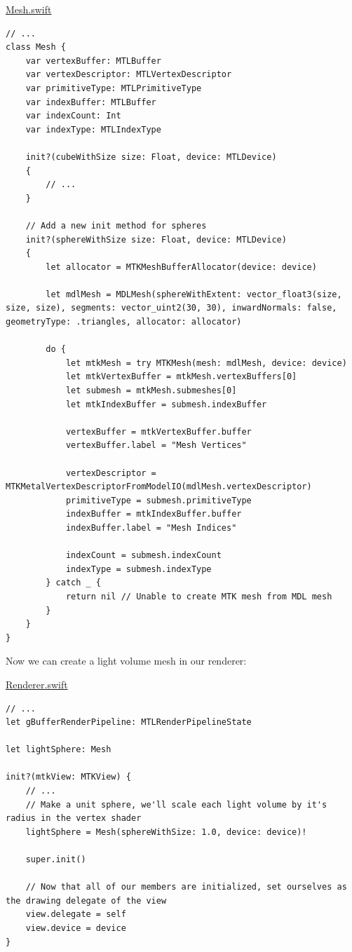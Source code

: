 \documentclass[11pt]{article}
\begin{document}
\uline{Mesh.swift}
\begin{verbatim}
// ...
class Mesh {
    var vertexBuffer: MTLBuffer
    var vertexDescriptor: MTLVertexDescriptor
    var primitiveType: MTLPrimitiveType
    var indexBuffer: MTLBuffer
    var indexCount: Int
    var indexType: MTLIndexType

    init?(cubeWithSize size: Float, device: MTLDevice)
    {
        // ...
    }

    // Add a new init method for spheres
    init?(sphereWithSize size: Float, device: MTLDevice)
    {
        let allocator = MTKMeshBufferAllocator(device: device)

        let mdlMesh = MDLMesh(sphereWithExtent: vector_float3(size, size, size), segments: vector_uint2(30, 30), inwardNormals: false, geometryType: .triangles, allocator: allocator)

        do {
            let mtkMesh = try MTKMesh(mesh: mdlMesh, device: device)
            let mtkVertexBuffer = mtkMesh.vertexBuffers[0]
            let submesh = mtkMesh.submeshes[0]
            let mtkIndexBuffer = submesh.indexBuffer

            vertexBuffer = mtkVertexBuffer.buffer
            vertexBuffer.label = "Mesh Vertices"

            vertexDescriptor = MTKMetalVertexDescriptorFromModelIO(mdlMesh.vertexDescriptor)
            primitiveType = submesh.primitiveType
            indexBuffer = mtkIndexBuffer.buffer
            indexBuffer.label = "Mesh Indices"

            indexCount = submesh.indexCount
            indexType = submesh.indexType
        } catch _ {
            return nil // Unable to create MTK mesh from MDL mesh
        }
    }
}
\end{verbatim}

Now we can create a light volume mesh in our renderer:

\uline{Renderer.swift}
\begin{verbatim}
// ...
let gBufferRenderPipeline: MTLRenderPipelineState

let lightSphere: Mesh

init?(mtkView: MTKView) {
    // ...
    // Make a unit sphere, we'll scale each light volume by it's radius in the vertex shader
    lightSphere = Mesh(sphereWithSize: 1.0, device: device)!

    super.init()

    // Now that all of our members are initialized, set ourselves as the drawing delegate of the view
    view.delegate = self
    view.device = device
}
\end{verbatim}
\end{document}
